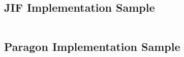 \subsection{JIF Implementation Sample} \label{appendix_csched_jif}

\inputminted{java}{content/code_sections/case_studies/csched_printout.jif}

\clearpage

\subsection{Paragon Implementation Sample} \label{appendix_csched_para}

\inputminted{java}{content/code_sections/case_studies/csched_printout.para}